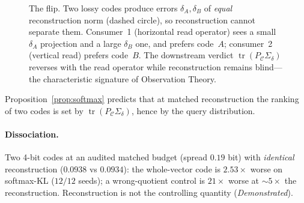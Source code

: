 \documentclass[lettersize,onecolumn]{IEEEtran}
\theoremstyle{definition}
\theoremstyle{remark}
\newcommand{\PC}{P_{\mathcal{C}}}
\newcommand{\Sd}{\Sigma_{\delta}}
\newcommand{\tr}{\operatorname{tr}}
\begin{document}
\begin{figure}[!t]
\centering
{}
\caption{The flip. Two lossy codes produce errors $\delta_A,\delta_B$ of \emph{equal}
reconstruction norm (dashed circle), so reconstruction cannot separate them. Consumer~1
(horizontal read operator) sees a small $\delta_A$ projection and a large $\delta_B$
one, and prefers code~$A$; consumer~2 (vertical read) prefers code~$B$. The downstream
verdict $\tr(\PC\Sigma_\delta)$ reverses with the read operator while reconstruction
remains blind---the characteristic signature of Observation Theory.}
\label{fig:flip}
\end{figure}

Proposition~\ref{prop:softmax} predicts that at matched reconstruction the ranking of
two codes is set by $\tr(\PC\Sd)$, hence by the query distribution.

\paragraph{Dissociation.} Two 4-bit codes at an audited matched budget (spread
$0.19$ bit) with \emph{identical} reconstruction ($0.0938$ vs $0.0934$): the
whole-vector code is $2.53\times$ worse on softmax-KL ($12/12$ seeds); a
wrong-quotient control is $21\times$ worse at $\sim\!5\times$ the reconstruction.
Reconstruction is not the controlling quantity (\emph{Demonstrated}).
\end{document}

